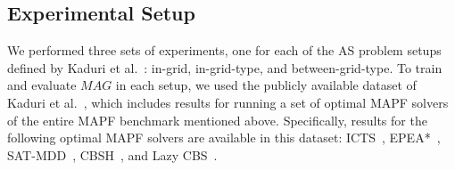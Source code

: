 \documentclass[letterpaper]{article} %
\newcommand{\shortcite}[1]{\cite{#1}}
\newcommand{\mapfgas}[1]{\ensuremath{\textit{MAG}}\xspace}
\begin{document}
\subsection{Experimental Setup}

We performed three sets of experiments, one for each of the AS problem setups defined by Kaduri et al.~\cite{kaduri2021experimental}: in-grid, in-grid-type, and between-grid-type.
To train and evaluate \mapfgas\ in each setup, we used the publicly available dataset of Kaduri et al.~\shortcite{kaduri2021experimental},
which includes results for running a set of optimal MAPF solvers of the entire MAPF benchmark mentioned above.
Specifically, results for the following optimal MAPF solvers are available in this dataset: ICTS~\cite{sharon2013increasing}, EPEA*~\cite{goldenberg2014enhanced}, SAT-MDD~\cite{surynek2016efficient}, CBSH~\cite{felner2018adding}, and Lazy CBS~\cite{gange2019lazy}.
\end{document}
